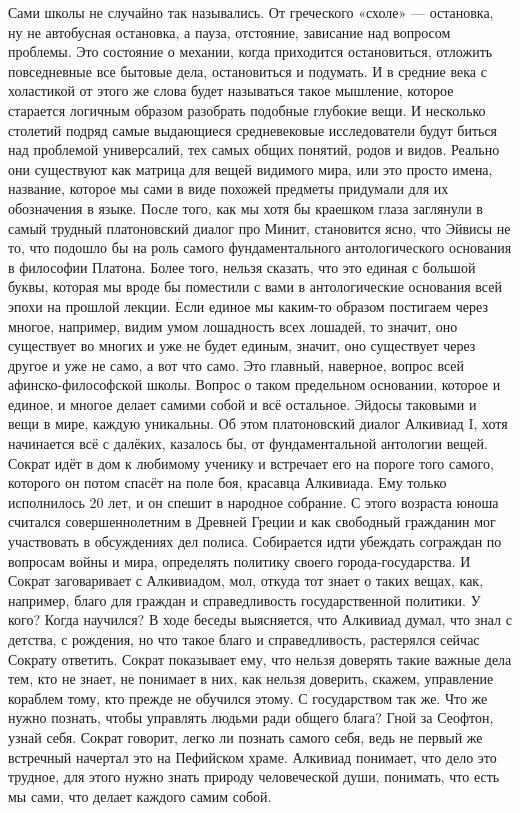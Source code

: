 Сами школы не случайно так
назывались. От греческого «схоле» — остановка, ну не автобусная остановка, а
пауза, отстояние, зависание над вопросом проблемы. Это состояние о механии,
когда приходится остановиться, отложить повседневные все бытовые дела,
остановиться и подумать. И в средние века с холастикой от этого же слова будет
называться такое мышление, которое старается логичным образом разобрать подобные
глубокие вещи. И несколько столетий подряд самые выдающиеся средневековые
исследователи будут биться над проблемой универсалий, тех самых общих понятий,
родов и видов. Реально они существуют как матрица для вещей видимого мира, или
это просто имена, название, которое мы сами в виде похожей предметы придумали
для их обозначения в языке. После того, как мы хотя бы краешком глаза заглянули
в самый трудный платоновский диалог про Минит, становится ясно, что Эйвисы не
то, что подошло бы на роль самого фундаментального антологического основания в
философии Платона. Более того, нельзя сказать, что это единая с большой буквы,
которая мы вроде бы поместили с вами в антологические основания всей эпохи на
прошлой лекции. Если единое мы каким-то образом постигаем через многое,
например, видим умом лошадность всех лошадей, то значит, оно существует во
многих и уже не будет единым, значит, оно существует через другое и уже не само,
а вот что само. Это главный, наверное, вопрос всей афинско-философской школы.
Вопрос о таком предельном основании, которое и единое, и многое делает самими
собой и всё остальное. Эйдосы таковыми и вещи в мире, каждую уникальны. Об этом
платоновский диалог Алкивиад I, хотя начинается всё с далёких, казалось бы, от
фундаментальной антологии вещей. Сократ идёт в дом к любимому ученику и
встречает его на пороге того самого, которого он потом спасёт на поле боя,
красавца Алкивиада. Ему только исполнилось 20 лет, и он спешит в народное
собрание. С этого возраста юноша считался совершеннолетним в Древней Греции и
как свободный гражданин мог участвовать в обсуждениях дел полиса. Собирается
идти убеждать сограждан по вопросам войны и мира, определять политику своего
города-государства. И Сократ заговаривает с Алкивиадом, мол, откуда тот знает о
таких вещах, как, например, благо для граждан и справедливость государственной
политики. У кого? Когда научился? В ходе беседы выясняется, что Алкивиад думал,
что знал с детства, с рождения, но что такое благо и справедливость, растерялся
сейчас Сократу ответить. Сократ показывает ему, что нельзя доверять такие важные
дела тем, кто не знает, не понимает в них, как нельзя доверить, скажем,
управление кораблем тому, кто прежде не обучился этому. С государством так же.
Что же нужно познать, чтобы управлять людьми ради общего блага? Гной за Сеофтон,
узнай себя. Сократ говорит, легко ли познать самого себя, ведь не первый же
встречный начертал это на Пефийском храме. Алкивиад понимает, что дело это
трудное, для этого нужно знать природу человеческой души, понимать, что есть мы
сами, что делает каждого самим собой. 

